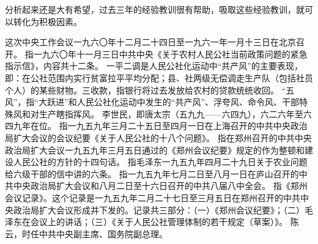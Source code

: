 分析起来还是大有希望，过去三年的经验教训很有帮助，吸取这些经验教训，就可以转化为积极因素。

\begin{maonote}
这次中央工作会议一九六〇年十二月二十四日至一九六一年一月十三日在北京召开。
指一九六〇年十一月三日中共中央《关于农村人民公社当前政策问题的紧急指示信》，内容共十二条。
一平二调是人民公社化运动中“共产风”的主要表现，即：在公社范围内实行贫富拉平平均分配；县、社两级无偿调走生产队（包括社员个人）的某些财物。三收款，指银行将过去发放给农村的贷款统统收回。
“五风”，指“大跃进”和人民公社化运动中发生的“共产风”、浮夸风、命令风、干部特殊风和对生产瞎指挥风。
李世民，即唐太宗（五九九——六四九），六二六年至六四九年在位。
指一九五九年三月二十五日至四月一日在上海召开的中共中央政治局扩大会议的会议纪要《关于人民公社的十八个问题》。
指在郑州召开的中共中央政治局扩大会议一九五九年三月五日通过的《郑州会议纪要》规定的作为整顿和建设人民公社的方针的十四句话。
指毛泽东一九五九年四月二十九日关于农业问题给六级干部的信中讲的六条。
指一九五九年七月二日至八月一日在庐山召开的中共中央政治局扩大会议和八月二日至十六日召开的中共八届八中全会。
指《郑州会议记录》。这个记录是一九五九年二月二十七日至三月五日在郑州召开的中共中央政治局扩大会议形成并下发的。记录共三部分：（一）《郑州会议纪要》；（二）毛泽东在会议上的讲话；（三）《关于人民公社管理体制的若干规定（草案）》。
陈云，时任中共中央副主席、国务院副总理。
\end{maonote}

